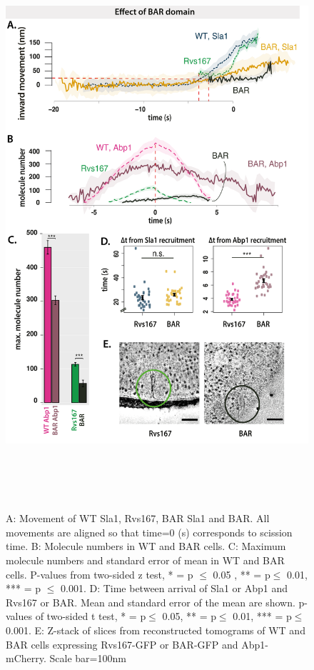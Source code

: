 \begin{figure}[H]
	\centering
	\includegraphics[width=21cm,height=21cm,keepaspectratio]{figures/results_final/delsh3_10}
	\caption [Tracking endocytic proteins in BAR cells]
	{A: Movement of WT Sla1, Rvs167, BAR Sla1 and BAR. All movements are aligned so that time=0 (s) corresponds to scission time. 
		B: Molecule numbers in WT and BAR cells.
		C: Maximum molecule numbers and standard error of mean in WT and BAR cells. P-values from two-sided z test, * = p $\leq$ 0.05 , ** = p$\leq$ 0.01, *** = p $\leq$ 0.001. 
		D: Time between arrival of Sla1 or Abp1 and Rvs167 or BAR. Mean and standard error of the mean are shown. p-values of two-sided t test,  * = p$\leq$ 0.05, ** = p$\leq$ 0.01, *** = p$\leq$ 0.001. 
		E: Z-stack of slices from reconstructed tomograms of WT and BAR cells expressing Rvs167-GFP or BAR-GFP and Abp1-mCherry.  Scale bar=100nm
		\label{fig2_sh3del}}
	
\end{figure}
